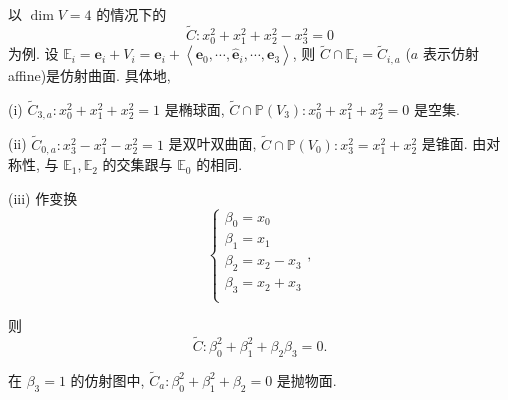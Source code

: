\documentclass[color=black,device=normal,lang=cn,mode=geye]{elegantnote}
\begin{document}
以 $\dim V=4$ 的情况下的
\[\widetilde{C}:x_0^2+x_1^2+x_2^2-x_3^2=0\]
为例. 设 $\mathbb{E}_i=\boldsymbol{e}_i+V_i=\boldsymbol{e}_i+\left<\boldsymbol{e}_0,\cdots,\hat{\boldsymbol{e}}_i,\cdots,\boldsymbol{e}_3\right>$, 则 $\widetilde{C}\cap\mathbb{E}_i=\widetilde{C}_{i,a}$ ($a$ 表示仿射 affine)是仿射曲面. 具体地,

(i) $\widetilde{C}_{3,a}:x_0^2+x_1^2+x_2^2=1$ 是椭球面, $\widetilde{C}\cap\mathbb{P}(V_3):x_0^2+x_1^2+x_2^2=0$ 是空集.

(ii) $\widetilde{C}_{0,a}:x_3^2-x_1^2-x_2^2=1$ 是双叶双曲面, $\widetilde{C}\cap\mathbb{P}(V_0):x_3^2=x_1^2+x_2^2$ 是锥面. 由对称性, 与 $\mathbb{E}_1,\mathbb{E}_2$ 的交集跟与 $\mathbb{E}_0$ 的相同.

(iii) 作变换
\[\begin{cases}
    \beta_0=x_0 \\
    \beta_1=x_1 \\
    \beta_2=x_2-x_3 \\
    \beta_3=x_2+x_3 \\
\end{cases},\]

则
\[\widetilde{C}:\beta_0^2+\beta_1^2+\beta_2\beta_3=0.\]

在 $\beta_3=1$ 的仿射图中, $\widetilde{C}_a:\beta_0^2+\beta_1^2+\beta_2=0$ 是抛物面.
\end{document}
